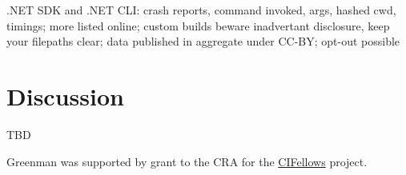 \documentclass[
  acmsmall,
  review,
  anonymous,
]{acmart}
\begin{document}
.NET SDK and .NET CLI:
crash reports, command invoked, args, hashed cwd, timings;
more listed online;
custom builds beware inadvertant disclosure, keep your filepaths clear;
data published in aggregate under CC-BY;
opt-out possible~\cite{dotnet-telemetry}




\section{Discussion}
\label{s:conclusion}
\label{s:discussion}



\begin{acks}
  TBD

Greenman was supported by
   grant
 \href{"https://www.nsf.gov/awardsearch/showAward?AWD_ID=2030859"}{}
  to the CRA for the \href{https://cifellows2020.org}{CIFellows} project.
\end{acks}



\end{document}
